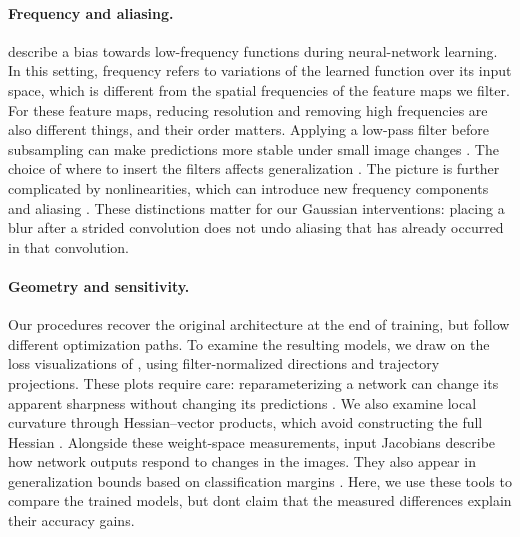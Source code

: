 \paragraph{Frequency and aliasing.}
\citet{rahaman2019spectral} describe a bias towards low-frequency functions during neural-network learning. In this setting, frequency refers to variations of the learned function over its input space, which is different from the spatial frequencies of the feature maps we filter. For these feature maps, reducing resolution and removing high frequencies are also different things, and their order matters. Applying a low-pass filter before subsampling can make predictions more stable under small image changes \citep{zhang2019shift}. The choice of where to insert the filters affects generalization \citep{vasconcelos2021aliasing}. The picture is further complicated by nonlinearities, which can introduce new frequency components and aliasing \citep{michaeli2023aliasfree}. These distinctions matter for our Gaussian interventions: placing a blur after a strided convolution does not undo aliasing that has already occurred in that convolution.


\paragraph{Geometry and sensitivity.}
Our procedures recover the original architecture at the end of training, but follow different optimization paths. To examine the resulting models, we draw on the loss visualizations of \citet{li2018visualizing}, using filter-normalized directions and trajectory projections. These plots require care: reparameterizing a network can change its apparent sharpness without changing its predictions \citep{dinh2017sharp}. We also examine local curvature through Hessian--vector products, which avoid constructing the full Hessian \citep{pearlmutter1994hessian,ghorbani2019hessian}. Alongside these weight-space measurements, input Jacobians describe how network outputs respond to changes in the images. They also appear in generalization bounds based on classification margins \citep{sokolic2017robust}. Here, we use these tools to compare the trained models, but dont claim that the measured differences explain their accuracy gains.

